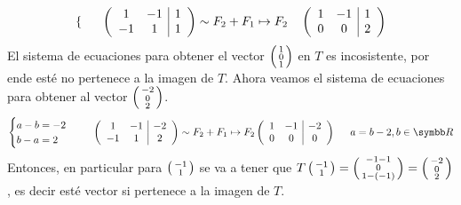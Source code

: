 \begin{itemize}
\[\begin{cases}
                \end{cases}
                \hspace{0.5cm}
                \left(
                \begin{array}{cc|c}
                    1 & -1 & 1 \\
                    -1 & 1 & 1
                \end{array}
                \right)
                \sim
                \begin{aligned}
                    F_2 + F_1 &\mapsto F_2 
                \end{aligned}
                \left(
                \begin{array}{cc|c}
                    1 & -1 & 1 \\
                    0 & 0 & 2
                \end{array}
                \right)
            \]
            El sistema de ecuaciones para obtener el vector \(\fsmvec{1,0,1}\) en \(T\) es incosistente, por ende esté no pertenece a la imagen de \(T\).
            Ahora veamos el sistema de ecuaciones para obtener al vector \(\fsmvec{-2,0,2}\).
            \[
                \begin{cases}
                    a - b = -2 \\
                    b - a = 2
                \end{cases}
                \hspace{0.5cm}
                \left(
                \begin{array}{cc|c}
                    1 & -1 & -2 \\
                    -1 & 1 & 2
                \end{array}
                \right)
                \sim
                \begin{aligned}
                    F_2 + F_1 &\mapsto F_2 \\
                \end{aligned}
                \left(
                \begin{array}{cc|c}
                    1 & -1 & -2 \\
                    0 & 0 & 0
                \end{array}
                \right)
                \hspace{0.5cm}
                a = b - 2, b \in \realR
            \]
            Entonces, en particular para \(\fsmvec{-1,1}\) se va a tener que \(T\fsmvec{-1,1} = \fsmvec{-1 - 1,0,1 - (-1)} = \fsmvec{-2,0,2}\), es decir 
            esté vector si pertenece a la imagen de \(T\).
    \end{itemize}
